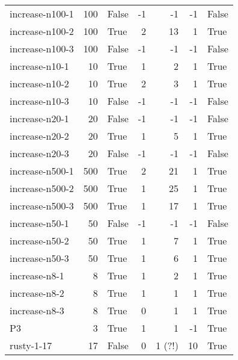\begin{longtable}{lrlrrrl}
increase-n100-1 & 100 & False & -1 & -1 & -1 & False \\

increase-n100-2 & 100 & True & 2 & 13 & 1 & True \\

increase-n100-3 & 100 & False & -1 & -1 & -1 & False \\

increase-n10-1 & 10 & True & 1 & 2 & 1 & True \\

increase-n10-2 & 10 & True & 2 & 3 & 1 & True \\

increase-n10-3 & 10 & False & -1 & -1 & -1 & False \\

increase-n20-1 & 20 & False & -1 & -1 & -1 & False \\

increase-n20-2 & 20 & True & 1 & 5 & 1 & True \\

increase-n20-3 & 20 & False & -1 & -1 & -1 & False \\

increase-n500-1 & 500 & True & 2 & 21 & 1 & True \\

increase-n500-2 & 500 & True & 1 & 25 & 1 & True \\

increase-n500-3 & 500 & True & 1 & 17 & 1 & True \\

increase-n50-1 & 50 & False & -1 & -1 & -1 & False \\

increase-n50-2 & 50 & True & 1 & 7 & 1 & True \\

increase-n50-3 & 50 & True & 1 & 6 & 1 & True \\

increase-n8-1 & 8 & True & 1 & 2 & 1 & True \\

increase-n8-2 & 8 & True & 1 & 1 & 1 & True \\

increase-n8-3 & 8 & True & 0 & 1 & 1 & True \\

P3 & 3 & True & 1 & 1 & -1 & True \\

rusty-1-17 & 17 & False & 0 & 1 (?!) & 10 & True \\


\end{longtable}
